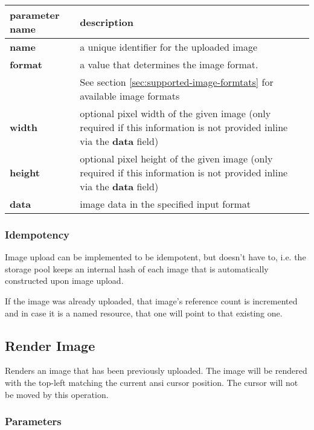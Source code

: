 \documentclass[a4paper]{article}
\begin{document}
\begin{tabular}{|l|l|l|}
  \hline
  \textbf{parameter name} & \textbf{description} \\
  \hline
  \textbf{name}           & a unique identifier for the uploaded image \\
  \textbf{format}         & a value that determines the image format. \\
                          & See section \ref{sec:supported-image-formtats} for available image formats \\
  \textbf{width}          & optional pixel width of the given image
                            (only required if this information is not provided
                            inline via the \textbf{data} field) \\
  \textbf{height}         & optional pixel height of the given image
                            (only required if this information is not provided
                            inline via the \textbf{data} field) \\
  \textbf{data}           & image data in the specified input format \\
  \hline
\end{tabular}

\subsubsection{Idempotency}

Image upload can be implemented to be idempotent, but doesn't have to,
i.e. the storage pool keeps an internal hash of each image that is
automatically constructed upon image upload.

If the image was already uploaded, that image's reference count is incremented
and in case it is a named resource, that one will point to that existing one.

\subsection{Render Image} %

Renders an image that has been previously uploaded.
The image will be rendered with the top-left matching the current ansi cursor position.
The cursor will not be moved by this operation.

\subsubsection*{Parameters}
\end{document}
